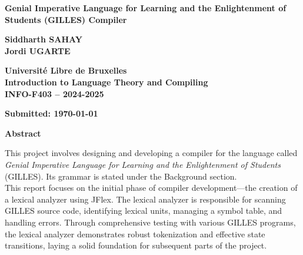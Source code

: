 \documentclass{article}
\begin{document}
	
	\begin{titlepage}
		\centering
		\vspace*{2cm}
		
		\Huge
		\textbf{Genial Imperative Language for Learning and the Enlightenment of Students (GILLES) Compiler}
		
		\vspace{1.5cm}
		
		\Large
		\textbf{Siddharth SAHAY} \\
		\textbf{Jordi UGARTE}		
		
		\vfill
		
		\Large
		\textbf{Université Libre de Bruxelles} \\
		\textbf{Introduction to Language Theory and Compiling} \\
		\textbf{INFO-F403 – 2024-2025}
		
		\vspace{0.8cm}
		
		\large
		\textbf{Submitted: \today}
		
		\vfill
	\end{titlepage}

	\tableofcontents
	\newpage
	\vspace*{\fill}
	\begin{center}
		\textbf{\LARGE Abstract} %
	\end{center}

	\begin{center}
		This project involves designing and developing a compiler for the language called \textit{Genial Imperative Language for Learning and the Enlightenment of Students} (GILLES). Its grammar is stated under the Background section.\\
		This report focuses on the initial phase of compiler development—the creation of a lexical analyzer using JFlex. The lexical analyzer is responsible for scanning GILLES source code, identifying lexical units, managing a symbol table, and handling errors. Through comprehensive testing with various GILLES programs, the lexical analyzer demonstrates robust tokenization and effective state transitions, laying a solid foundation for subsequent parts of the project.
	\end{center}
	\vspace*{\fill}


	\newpage
	
\end{document}
